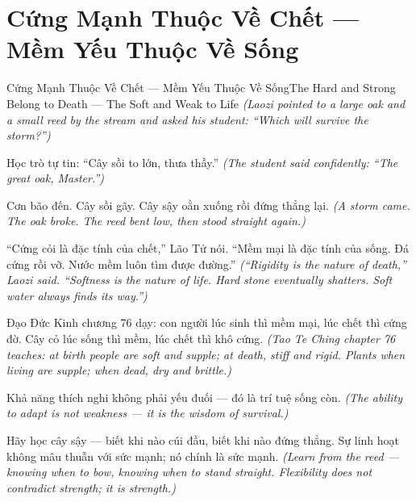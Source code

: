 \section{Cứng Mạnh Thuộc Về Chết — Mềm Yếu Thuộc Về Sống}
\begin{truyen}{Cứng Mạnh Thuộc Về Chết — Mềm Yếu Thuộc Về Sống}{The Hard and Strong Belong to Death — The Soft and Weak to Life}
\textit{(Laozi pointed to a large oak and a small reed by the stream and asked his student: ``Which will survive the storm?'')}

Học trò tự tin: ``Cây sồi to lớn, thưa thầy.''
\textit{(The student said confidently: ``The great oak, Master.'')}

Cơn bão đến. Cây sồi gãy. Cây sậy oằn xuống rồi đứng thẳng lại.
\textit{(A storm came. The oak broke. The reed bent low, then stood straight again.)}

``Cứng cỏi là đặc tính của chết,'' Lão Tử nói. ``Mềm mại là đặc tính của sống. Đá cứng rồi vỡ. Nước mềm luôn tìm được đường.''
\textit{(``Rigidity is the nature of death,'' Laozi said. ``Softness is the nature of life. Hard stone eventually shatters. Soft water always finds its way.'')}

Đạo Đức Kinh chương 76 dạy: con người lúc sinh thì mềm mại, lúc chết thì cứng đờ. Cây cỏ lúc sống thì mềm, lúc chết thì khô cứng.
\textit{(Tao Te Ching chapter 76 teaches: at birth people are soft and supple; at death, stiff and rigid. Plants when living are supple; when dead, dry and brittle.)}

Khả năng thích nghi không phải yếu đuối — đó là trí tuệ sống còn.
\textit{(The ability to adapt is not weakness — it is the wisdom of survival.)}

\end{truyen}

\begin{baihoc}
Hãy học cây sậy — biết khi nào cúi đầu, biết khi nào đứng thẳng. Sự linh hoạt không mâu thuẫn với sức mạnh; nó chính là sức mạnh.
\textit{(Learn from the reed — knowing when to bow, knowing when to stand straight. Flexibility does not contradict strength; it is strength.)}
\end{baihoc}
\ngancach

